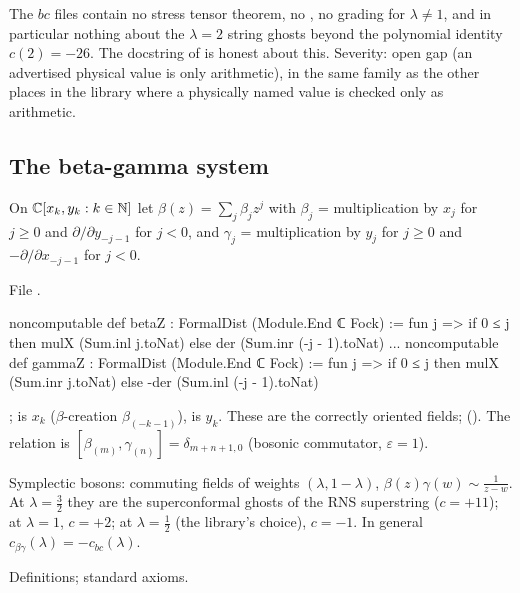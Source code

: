 \begin{warning}[title={Finding (F6): what the bc files do not contain}]
The $bc$ files contain no stress tensor theorem, no , no grading for $\lambda\neq1$,
and in particular nothing about the $\lambda=2$ string ghosts beyond the polynomial identity
$c(2)=-26$. The docstring of  is honest about this. Severity: open gap (an
advertised physical value is only arithmetic), in the same family as the other places in the library where a physically named
value is checked only as arithmetic.
\end{warning}

\subsection{The beta-gamma system}\label{l17:sec:bg}

\begin{definition}\label{l17:def:bg}
On ${\mathbb{C}}[x_k,y_k:k\in{\mathbb{N}}]$ let $\beta(z)=\sum_j\beta_jz^j$ with $\beta_j$ = multiplication by $x_j$ for
$j\ge0$ and $\partial/\partial y_{-j-1}$ for $j<0$, and $\gamma_j$ = multiplication by $y_j$ for $j\ge0$
and $-\partial/\partial x_{-j-1}$ for $j<0$.
\end{definition}
\noindent File .
\begin{leancode}
noncomputable def betaZ : FormalDist (Module.End ℂ Fock) :=
  fun j => if 0 ≤ j then mulX (Sum.inl j.toNat) else der (Sum.inr (-j - 1).toNat)
...
noncomputable def gammaZ : FormalDist (Module.End ℂ Fock) :=
  fun j => if 0 ≤ j then mulX (Sum.inr j.toNat) else -der (Sum.inl (-j - 1).toNat)
\end{leancode}
\begin{dictionary}
;  is $x_k$ ($\beta$-creation $\beta_{(-k-1)}$),
 is $y_k$. These are the correctly oriented fields; 
(). The relation is $[\beta_{(m)},\gamma_{(n)}]=\delta_{m+n+1,0}$ (bosonic commutator,
$\varepsilon=1$).
\end{dictionary}
\begin{physics}
Symplectic bosons: commuting fields of weights $(\lambda,1-\lambda)$, $\beta(z)\gamma(w)\sim\frac{1}{z-w}$.
At $\lambda=\frac32$ they are the superconformal ghosts of the RNS superstring ($c=+11$); at
$\lambda=1$, $c=+2$; at $\lambda=\frac12$ (the library's choice), $c=-1$. In general
$c_{\beta\gamma}(\lambda)=-c_{bc}(\lambda)$.
\end{physics}
\begin{status}
Definitions; standard axioms.
\end{status}

